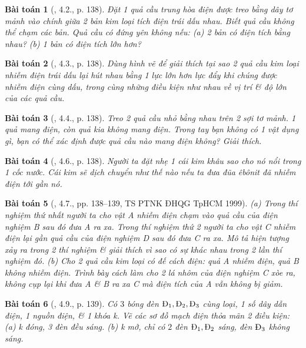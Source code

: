 \documentclass{article}
\newtheorem{baitoan}{Bài toán}
\begin{document}
\begin{baitoan}[\cite{Van_500_BT_Vat_Ly_THCS}, 4.2., p. 138]
	Đặt 1 quả cầu trung hòa điện được treo bằng dây tơ mảnh vào chính giữa 2 bản kim loại tích điện trái dấu nhau. Biết quả cầu không thể chạm các bản. Quả cầu có đứng yên không nếu: (a) 2 bản có điện tích bằng nhau? (b) 1 bản có điện tích lớn hơn?
\end{baitoan}

\begin{baitoan}[\cite{Van_500_BT_Vat_Ly_THCS}, 4.3., p. 138]
	Dùng hình vẽ để giải thích tại sao 2 quả cầu kim loại nhiễm điện trái dấu lại hút nhau bằng 1 lực lớn hơn lực đẩy khi chúng được nhiễm điện cùng dấu, trong cùng những điều kiện như nhau về vị trí \& độ lớn của các quả cầu.
\end{baitoan}

\begin{baitoan}[\cite{Van_500_BT_Vat_Ly_THCS}, 4.4., p. 138]
	Treo 2 quả cầu nhỏ bằng nhau trên 2 sợi tơ mảnh. 1 quả mang điện, còn quả kia không mang điện. Trong tay bạn không có 1 vật dụng gì, bạn có thể xác định được quả cầu nào mang điện không? Giải thích.
\end{baitoan}

\begin{baitoan}[\cite{Van_500_BT_Vat_Ly_THCS}, 4.6., p. 138]
	Người ta đặt nhẹ 1 cái kim khâu sao cho nó nổi trong 1 cốc nước. Cái kim sẽ dịch chuyển như thế nào nếu ta đưa đũa êbônit đã nhiễm điện tới gần nó.
\end{baitoan}

\begin{baitoan}[\cite{Van_500_BT_Vat_Ly_THCS}, 4.7., pp. 138--139, TS PTNK ĐHQG TpHCM 1999]
	(a) Trong thí nghiệm thứ nhất người ta cho vật A nhiễm điện chạm vào quả cầu của điện nghiệm B sau đó đưa A ra xa. Trong thí nghiệm thứ 2 người ta cho vật C nhiễm điện lại gần quả cầu của điện nghiệm D sau đó đưa C ra xa. Mô tả hiện tượng xảy ra trong 2 thí nghiệm \& giải thích vì sao có sự khác nhau trong 2 lần thí nghiệm đó. (b) Cho 2 quả cầu kim loại có đế cách điện: quả A nhiễm điện, quả B không nhiễm điện. Trình bày cách làm cho 2 lá nhôm của điện nghiệm C xòe ra, không cụp lại khi đưa A \& B ra xa C mà điện tích của A vẫn không bị giảm.
\end{baitoan}

\begin{baitoan}[\cite{Van_500_BT_Vat_Ly_THCS}, 4.9., p. 139]
	Có $3$ bóng đèn $\rm\mbox{Đ}_1,\mbox{Đ}_2,\mbox{Đ}_3$ cùng loại, 1 số dây dẫn điện, 1 nguồn điện, \& 1 khóa k. Vẽ các sơ đồ mạch điện thỏa mãn 2 điều kiện: (a) k đóng, 3 đèn đều sáng. (b) k mở, chỉ có $2$ đèn $\rm\mbox{Đ}_1,\mbox{Đ}_2$ sáng, đèn $\rm\mbox{Đ}_3$ không sáng.
\end{baitoan}
\end{document}
